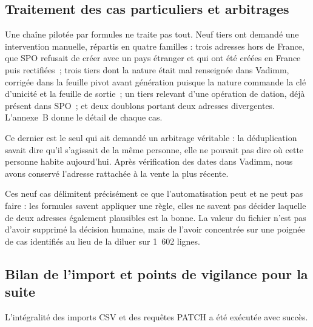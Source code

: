 \hypertarget{traitement-des-cas-particuliers-et-arbitrages}{%
\subsection{Traitement des cas particuliers et arbitrages}\label{traitement-des-cas-particuliers-et-arbitrages}}

Une chaîne pilotée par formules ne traite pas tout. Neuf tiers ont demandé une intervention
manuelle, répartis en quatre familles : trois adresses hors de France, que SPO refusait de
créer avec un pays étranger et qui ont été créées en France puis rectifiées~; trois tiers dont
la nature était mal renseignée dans Vadimm, corrigée dans la feuille pivot avant génération
puisque la nature commande la clé d'unicité et la feuille de sortie~; un tiers relevant d'une
opération de dation, déjà présent dans SPO~; et deux doublons portant deux adresses
divergentes. L'annexe~B donne le détail de chaque cas.

Ce dernier est le seul qui ait demandé un arbitrage véritable : la déduplication savait dire
qu'il s'agissait de la même personne, elle ne pouvait pas dire où cette personne habite
aujourd'hui. Après vérification des dates dans Vadimm, nous avons conservé l'adresse rattachée
à la vente la plus récente.

Ces neuf cas délimitent précisément ce que l'automatisation peut et ne peut pas faire : les
formules savent appliquer une règle, elles ne savent pas décider laquelle de deux adresses
également plausibles est la bonne. La valeur du fichier n'est pas d'avoir supprimé la décision
humaine, mais de l'avoir concentrée sur une poignée de cas identifiés au lieu de la diluer sur
1~602 lignes.

\hypertarget{bilan-de-limport-et-points-de-vigilance-pour-la-suite}{%
\subsection{Bilan de l'import et points de vigilance pour la suite}\label{bilan-de-limport-et-points-de-vigilance-pour-la-suite}}

L'intégralité des imports CSV et des requêtes PATCH a été exécutée avec succès.

